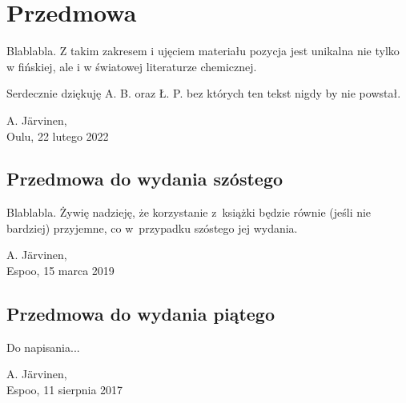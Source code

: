 

\chapter*{Przedmowa}
Blablabla.
Z takim zakresem i ujęciem materiału pozycja jest unikalna nie tylko w fińskiej, ale i w światowej literaturze chemicznej.

Serdecznie dziękuję A. B. oraz Ł. P. bez których ten tekst nigdy by nie powstał.\\${}$

\begin{flushright}
A. Järvinen,\\Oulu, 22 lutego 2022
\end{flushright}

\section*{Przedmowa do wydania szóstego}
Blablabla.
Żywię nadzieję, że korzystanie z~książki będzie równie (jeśli nie bardziej) przyjemne, co w~przypadku szóstego jej wydania.

\begin{flushright}
A. Järvinen,\\Espoo, 15 marca 2019
\end{flushright}

\section*{Przedmowa do wydania piątego}
Do napisania...

\begin{flushright}
A. Järvinen,\\Espoo, 11 sierpnia 2017
\end{flushright}


